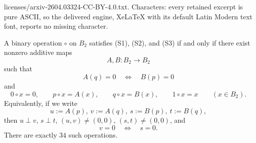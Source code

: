 \documentclass[10pt,a4paper]{amsart}
\newcommand{\perpdef}{\mathrel{\perp}}
\begin{document}
licenses/arxiv-2604.03324-CC-BY-4.0.txt. Characters: every retained excerpt is pure ASCII, so the delivered engine, XeLaTeX with its default Latin Modern text font, reports no missing character.
\begin{theorem}\label{thm:B2-S123-classification}
A binary operation $\circ$ on $B_2$ satisfies \textup{(S1)}, \textup{(S2)}, and \textup{(S3)} if and only if there exist nonzero additive maps
\[
A,B\colon B_2\to B_2
\]
such that
\begin{equation}\label{eq:cross-zero-condition}
A(q)=0 \quad\Longleftrightarrow\quad B(p)=0
\end{equation}
and
\begin{equation}\label{eq:B2-row-form}
0\circ x=0,\qquad p\circ x=A(x),\qquad q\circ x=B(x),\qquad 1\circ x=x
\qquad (x\in B_2).
\end{equation}
Equivalently, if we write
\[
u:=A(p),\ v:=A(q),\ s:=B(p),\ t:=B(q),
\]
then $u\perpdef v$, $s\perpdef t$, $(u,v)\neq(0,0)$, $(s,t)\neq(0,0)$, and
\[
v=0 \quad\Longleftrightarrow\quad s=0.
\]
There are exactly $34$ such operations.
\end{theorem}
\end{document}
